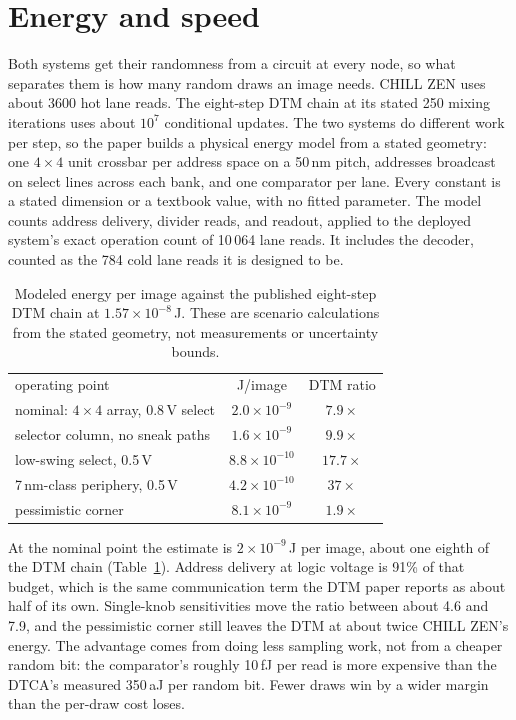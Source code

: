 \documentclass[reprint,amsmath,amssymb,aps,nofootinbib]{revtex4-2}
\begin{document}
\section{Energy and speed}

Both systems get their randomness from a circuit at every node, so
what separates them is how many random draws an image needs. CHILL
ZEN uses about 3600 hot lane reads. The eight-step DTM chain at its
stated 250 mixing iterations uses about $10^{7}$ conditional updates.
The two systems do different work per step, so the paper builds a
physical energy model from a stated geometry: one $4 \times 4$ unit
crossbar per address space on a 50\,nm pitch, addresses broadcast on
select lines across each bank, and one comparator per lane. Every
constant is a stated dimension or a textbook value, with no fitted
parameter. The model counts address delivery, divider reads, and
readout, applied to the deployed system's exact operation count of
10\,064 lane reads. It includes the decoder, counted as the 784 cold
lane reads it is designed to be.

\begin{table}
\caption{Modeled energy per image against the published eight-step DTM
chain at $1.57\times10^{-8}$\,J. These are scenario calculations from
the stated geometry, not measurements or uncertainty
bounds.\label{tab:energy}}
\begin{ruledtabular}
\begin{tabular}{lcc}
operating point & J/image & DTM ratio \\
\colrule
nominal: $4 \times 4$ array, 0.8\,V select & $2.0\times10^{-9}$ & $7.9\times$ \\
selector column, no sneak paths & $1.6\times10^{-9}$ & $9.9\times$ \\
low-swing select, 0.5\,V & $8.8\times10^{-10}$ & $17.7\times$ \\
7\,nm-class periphery, 0.5\,V & $4.2\times10^{-10}$ & $37\times$ \\
pessimistic corner & $8.1\times10^{-9}$ & $1.9\times$ \\
\end{tabular}
\end{ruledtabular}
\end{table}

At the nominal point the estimate is $2\times10^{-9}$\,J per image,
about one eighth of the DTM chain (Table~\ref{tab:energy}). Address
delivery at logic voltage is 91\% of that budget, which is the same
communication term the DTM paper reports as about half of its own.
Single-knob sensitivities move the ratio between about 4.6 and 7.9,
and the pessimistic corner still leaves the DTM at about twice CHILL
ZEN's energy. The advantage comes from doing less sampling work, not
from a cheaper random bit: the comparator's roughly 10\,fJ per read is
more expensive than the DTCA's measured 350\,aJ per random bit. Fewer
draws win by a wider margin than the per-draw cost loses.
\end{document}
